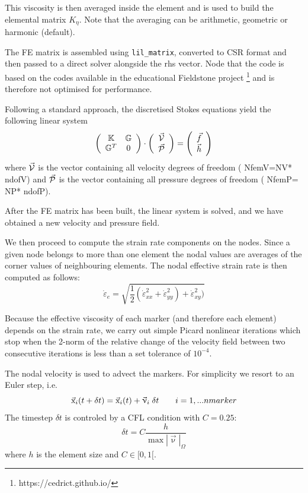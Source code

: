 \documentclass[a4paper]{article}
\newcommand{\K}{{\mathbb{K}}}
\newcommand{\G}{{\mathbb{G}}}
\begin{document}
This viscosity is then averaged inside the element and is used to build
the elemental matrix $K_\eta$. Note that the averaging can be arithmetic,
geometric or harmonic (default).

The FE matrix is assembled using \lstinline{lil_matrix},
converted to CSR format and then passed to a direct solver alongside the rhs vector.
Node that the code is based on the codes available in the educational Fieldstone project
\footnote{https://cedrict.github.io/}
and is therefore not optimised for performance.


Following a standard approach, the discretised Stokes equations yield
the following linear system
\[
\left(
\begin{array}{cc}
\K & \G \\
\G^T & 0 
\end{array}
\right)
\cdot
\left(
\begin{array}{c}
\vec{\cal V} \\ 
\vec{\cal P}
\end{array}
\right)
=
\left(
\begin{array}{c}
\vec{f} \\ 
\vec{h}
\end{array}
\right)
\]
where $\vec{\cal V}$ is the vector containing all velocity degrees of 
freedom ({ NfemV}={NV}*{ ndofV})
and $\vec{\cal P}$ is the vector containing all pressure degrees of freedom 
({ NfemP}={ NP}*{ ndofP}).

After the FE matrix has been built, the linear system is solved, and 
we have obtained a new velocity and pressure field.

We then proceed to compute the strain rate components on the nodes.
Since a given node belongs to more than one element the nodal values 
are averages of the corner values of neighbouring elements.
The nodal effective strain rate is then computed as follows:
\[
\dot\varepsilon_e = \sqrt{\frac12 (
\dot\varepsilon_{xx}^2+
\dot\varepsilon_{yy}^2)+
\dot\varepsilon_{xy}^2
)} 
\]

Because the effective viscosity of each marker (and therefore each element)
depends on the strain rate, we carry out simple Picard nonlinear iterations 
which stop when the 2-norm of the relative change of the velocity field between two consecutive 
iterations is less than a set tolerance of $10^{-4}$.


The nodal velocity is used to advect the markers. 
For simplicity we resort to an Euler step, i.e.
\[
\vec{\text x}_i(t+\delta t) = \vec{\text x}_i(t) + \vec\upnu_i \; \delta t
\qquad
i=1,...nmarker 
\]
The timestep $\delta t$ is controled by a CFL condition with $C=0.25$:
\[
\delta t = C \frac{h}{\max |\vec\upnu|_\Omega}
\]
where $h$ is the element size and $C\in[0,1[$.
\end{document}
